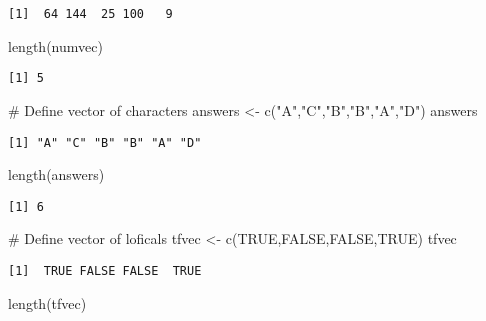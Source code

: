 \documentclass[
  letterpaper,
  DIV=11,
  numbers=noendperiod]{scrartcl}
\newenvironment{Shaded}{\begin{snugshade}}{\end{snugshade}}
\newcommand{\CommentTok}[1]{\textcolor[rgb]{0.37,0.37,0.37}{#1}}
\newcommand{\ConstantTok}[1]{\textcolor[rgb]{0.56,0.35,0.01}{#1}}
\newcommand{\FunctionTok}[1]{\textcolor[rgb]{0.28,0.35,0.67}{#1}}
\newcommand{\NormalTok}[1]{\textcolor[rgb]{0.00,0.23,0.31}{#1}}
\newcommand{\OtherTok}[1]{\textcolor[rgb]{0.00,0.23,0.31}{#1}}
\newcommand{\StringTok}[1]{\textcolor[rgb]{0.13,0.47,0.30}{#1}}
\begin{document}
\begin{verbatim}
[1]  64 144  25 100   9
\end{verbatim}

\begin{Shaded}
\begin{Highlighting}[]
\FunctionTok{length}\NormalTok{(numvec)}
\end{Highlighting}
\end{Shaded}

\begin{verbatim}
[1] 5
\end{verbatim}

\begin{Shaded}
\begin{Highlighting}[]
\CommentTok{\# Define vector of characters}
\NormalTok{answers }\OtherTok{\textless{}{-}} \FunctionTok{c}\NormalTok{(}\StringTok{"A"}\NormalTok{,}\StringTok{"C"}\NormalTok{,}\StringTok{"B"}\NormalTok{,}\StringTok{"B"}\NormalTok{,}\StringTok{"A"}\NormalTok{,}\StringTok{"D"}\NormalTok{)}
\NormalTok{answers}
\end{Highlighting}
\end{Shaded}

\begin{verbatim}
[1] "A" "C" "B" "B" "A" "D"
\end{verbatim}

\begin{Shaded}
\begin{Highlighting}[]
\FunctionTok{length}\NormalTok{(answers)}
\end{Highlighting}
\end{Shaded}

\begin{verbatim}
[1] 6
\end{verbatim}

\begin{Shaded}
\begin{Highlighting}[]
\CommentTok{\# Define vector of loficals}
\NormalTok{tfvec }\OtherTok{\textless{}{-}} \FunctionTok{c}\NormalTok{(}\ConstantTok{TRUE}\NormalTok{,}\ConstantTok{FALSE}\NormalTok{,}\ConstantTok{FALSE}\NormalTok{,}\ConstantTok{TRUE}\NormalTok{)}
\NormalTok{tfvec}
\end{Highlighting}
\end{Shaded}

\begin{verbatim}
[1]  TRUE FALSE FALSE  TRUE
\end{verbatim}

\begin{Shaded}
\begin{Highlighting}[]
\FunctionTok{length}\NormalTok{(tfvec)}
\end{Highlighting}
\end{Shaded}
\end{document}
